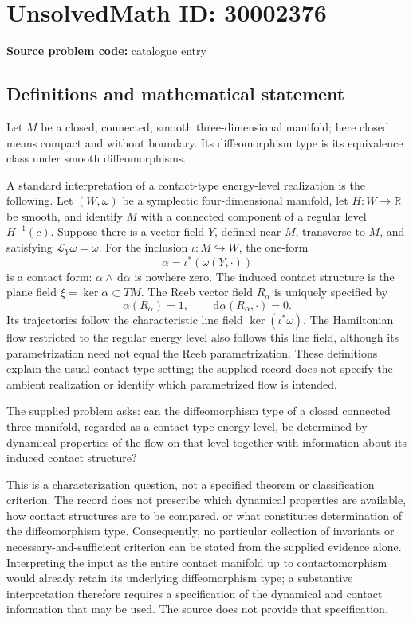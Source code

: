 \documentclass[11pt]{article}
\newcommand{\R}{\mathbb{R}}
\newcommand{\dd}{\,\mathrm{d}}
\begin{document}
\section*{UnsolvedMath ID: 30002376}
\textbf{Source problem code:} catalogue entry
\subsection{Definitions and mathematical statement}
Let \(M\) be a closed, connected, smooth three-dimensional manifold; here closed means compact and without boundary. Its diffeomorphism type is its equivalence class under smooth diffeomorphisms.

A standard interpretation of a contact-type energy-level realization is the following. Let \((W,\omega)\) be a symplectic four-dimensional manifold, let \(H\colon W\to\R\) be smooth, and identify \(M\) with a connected component of a regular level \(H^{-1}(c)\). Suppose there is a vector field \(Y\), defined near \(M\), transverse to \(M\), and satisfying \(\mathcal L_Y\omega=\omega\). For the inclusion \(\iota\colon M\hookrightarrow W\), the one-form
\[
\alpha=\iota^*(\omega(Y,\cdot))
\]
is a contact form: \(\alpha\wedge\dd\alpha\) is nowhere zero. The induced contact structure is the plane field \(\xi=\ker\alpha\subset TM\). The Reeb vector field \(R_\alpha\) is uniquely specified by
\[
\alpha(R_\alpha)=1,
\qquad
\dd\alpha(R_\alpha,\cdot)=0.
\]
Its trajectories follow the characteristic line field \(\ker(\iota^*\omega)\). The Hamiltonian flow restricted to the regular energy level also follows this line field, although its parametrization need not equal the Reeb parametrization. These definitions explain the usual contact-type setting; the supplied record does not specify the ambient realization or identify which parametrized flow is intended.

The supplied problem asks: can the diffeomorphism type of a closed connected three-manifold, regarded as a contact-type energy level, be determined by dynamical properties of the flow on that level together with information about its induced contact structure?

This is a characterization question, not a specified theorem or classification criterion. The record does not prescribe which dynamical properties are available, how contact structures are to be compared, or what constitutes determination of the diffeomorphism type. Consequently, no particular collection of invariants or necessary-and-sufficient criterion can be stated from the supplied evidence alone. Interpreting the input as the entire contact manifold up to contactomorphism would already retain its underlying diffeomorphism type; a substantive interpretation therefore requires a specification of the dynamical and contact information that may be used. The source does not provide that specification.
\end{document}
